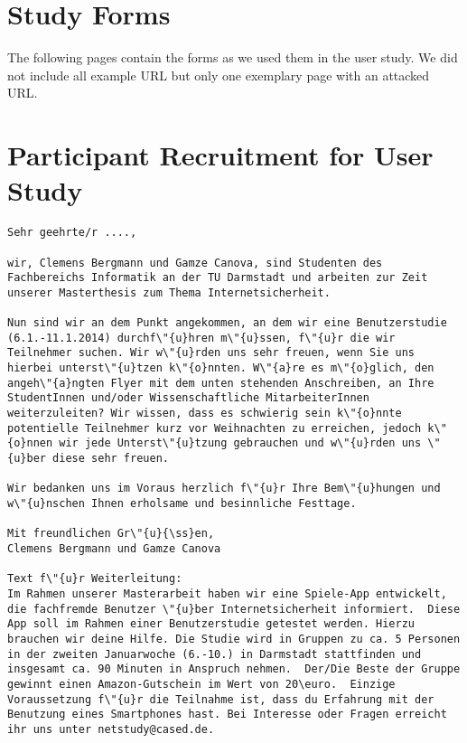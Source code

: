 \section{Study Forms}
The following pages contain the forms as we used them in the user study. We did not include all example URL but only one exemplary page with an attacked URL.
\label{s:before_survey}

\label{s:url_survey}

\label{s:after_survey}


\section{Participant Recruitment for User Study}
\label{s:participant_recruitment}
\begin{lstlisting}
Sehr geehrte/r ....,

wir, Clemens Bergmann und Gamze Canova, sind Studenten des Fachbereichs Informatik an der TU Darmstadt und arbeiten zur Zeit unserer Masterthesis zum Thema Internetsicherheit.

Nun sind wir an dem Punkt angekommen, an dem wir eine Benutzerstudie (6.1.-11.1.2014) durchf\"{u}hren m\"{u}ssen, f\"{u}r die wir Teilnehmer suchen. Wir w\"{u}rden uns sehr freuen, wenn Sie uns hierbei unterst\"{u}tzen k\"{o}nnten. W\"{a}re es m\"{o}glich, den angeh\"{a}ngten Flyer mit dem unten stehenden Anschreiben, an Ihre StudentInnen und/oder Wissenschaftliche MitarbeiterInnen  weiterzuleiten? Wir wissen, dass es schwierig sein k\"{o}nnte potentielle Teilnehmer kurz vor Weihnachten zu erreichen, jedoch k\"{o}nnen wir jede Unterst\"{u}tzung gebrauchen und w\"{u}rden uns \"{u}ber diese sehr freuen.

Wir bedanken uns im Voraus herzlich f\"{u}r Ihre Bem\"{u}hungen und w\"{u}nschen Ihnen erholsame und besinnliche Festtage.

Mit freundlichen Gr\"{u}{\ss}en, 
Clemens Bergmann und Gamze Canova

Text f\"{u}r Weiterleitung:
Im Rahmen unserer Masterarbeit haben wir eine Spiele-App entwickelt, die fachfremde Benutzer \"{u}ber Internetsicherheit informiert.  Diese App soll im Rahmen einer Benutzerstudie getestet werden. Hierzu brauchen wir deine Hilfe. Die Studie wird in Gruppen zu ca. 5 Personen in der zweiten Januarwoche (6.-10.) in Darmstadt stattfinden und insgesamt ca. 90 Minuten in Anspruch nehmen.  Der/Die Beste der Gruppe gewinnt einen Amazon-Gutschein im Wert von 20\euro.  Einzige Voraussetzung f\"{u}r die Teilnahme ist, dass du Erfahrung mit der Benutzung eines Smartphones hast. Bei Interesse oder Fragen erreicht ihr uns unter netstudy@cased.de. 
\end{lstlisting}


